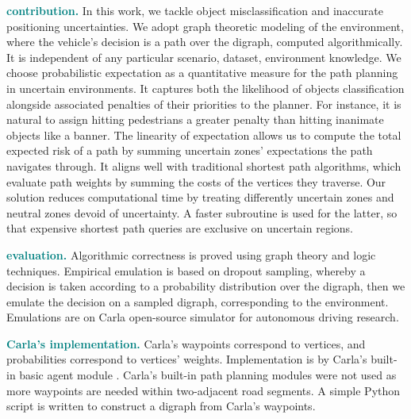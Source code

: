 \textcolor{teal}{\textbf{contribution.}} In this work, we tackle object misclassification and inaccurate positioning uncertainties. We adopt graph theoretic modeling of the environment, where the vehicle's decision is a path over the digraph, computed algorithmically. It is independent of any particular scenario, dataset, environment knowledge. We choose probabilistic expectation as a quantitative measure for the path planning in uncertain environments. It captures both the likelihood of objects classification alongside associated penalties of their priorities to the planner. For instance, it is natural to assign hitting pedestrians a greater penalty than hitting inanimate objects like a banner. The linearity of expectation allows us to compute the total expected risk of a path by summing uncertain zones' expectations the path navigates through. It aligns well with traditional shortest path algorithms, which evaluate path weights by summing the costs of the vertices they traverse. Our solution reduces computational time by treating differently uncertain zones and neutral zones devoid of uncertainty. A faster subroutine is used for the latter, so that expensive shortest path queries are exclusive on uncertain regions.

\textcolor{teal}{\textbf{evaluation.}} Algorithmic correctness is proved using graph theory and logic techniques. Empirical emulation is based on dropout sampling, whereby a decision is taken according to a probability distribution over the digraph, then we emulate the decision on a sampled digraph, corresponding to the environment. Emulations are on Carla open-source simulator for autonomous driving research.

\textcolor{teal}{\textbf{Carla's implementation.}} Carla's waypoints correspond to vertices, and probabilities correspond to vertices' weights. Implementation is by Carla's built-in basic agent module \cite{py-carla}. Carla's built-in path planning modules were not used as more waypoints are needed within two-adjacent road segments. A simple Python script is written to construct a digraph from Carla's waypoints.
